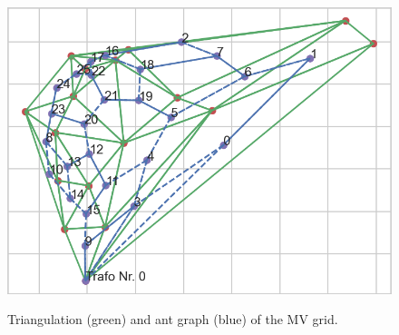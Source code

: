 \begin{figure}[h]
	\begin{centering}
		{\includegraphics[scale=0.5]{figures/experiments/1000_iter/tri_ant_1000.png}}
		\caption{Triangulation (green) and ant graph (blue) of the MV grid.}
		\label{fig:tri_ant_1000}
	\end{centering}
\end{figure}
